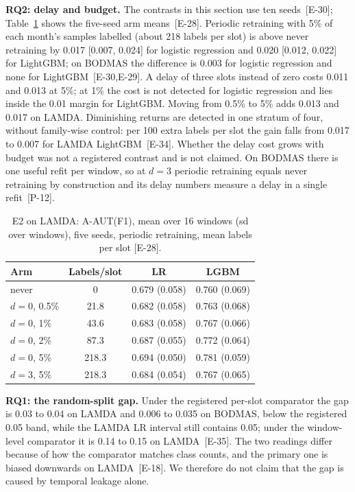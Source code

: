 \documentclass[conference,a4paper]{IEEEtran}
\newcommand{\clm}[1]{{\scriptsize[#1]}}
\begin{document}
\textbf{RQ2: delay and budget.} The contrasts in this section use ten seeds~\clm{E-30}; Table~\ref{tab:e2} shows the five-seed arm means~\clm{E-28}. Periodic retraining with 5\% of each month's samples labelled (about 218 labels per slot) is above never retraining by 0.017 [0.007, 0.024] for logistic regression and 0.020 [0.012, 0.022] for LightGBM; on BODMAS the difference is 0.003 for logistic regression and none for LightGBM~\clm{E-30,E-29}. A delay of three slots instead of zero costs 0.011 and 0.013 at 5\%; at 1\% the cost is not detected for logistic regression and lies inside the 0.01 margin for LightGBM. Moving from 0.5\% to 5\% adds 0.013 and 0.017 on LAMDA. Diminishing returns are detected in one stratum of four, without family-wise control: per 100 extra labels per slot the gain falls from 0.017 to 0.007 for LAMDA LightGBM~\clm{E-34}. Whether the delay cost grows with budget was not a registered contrast and is not claimed. On BODMAS there is one useful refit per window, so at $d=3$ periodic retraining equals never retraining by construction and its delay numbers measure a delay in a single refit~\clm{P-12}.

\begin{table}[t]
\centering
\caption{E2 on LAMDA: A-AUT(F1), mean over 16 windows (sd over windows), five seeds, periodic retraining, mean labels per slot \clm{E-28}.}
\label{tab:e2}
\small
\begin{tabular}{@{}lccc@{}}
\toprule
Arm & Labels/slot & LR & LGBM\\
\midrule
never & 0 & 0.679 (0.058) & 0.760 (0.069)\\
$d{=}0$, 0.5\% & 21.8 & 0.682 (0.058) & 0.763 (0.068)\\
$d{=}0$, 1\% & 43.6 & 0.683 (0.058) & 0.767 (0.066)\\
$d{=}0$, 2\% & 87.3 & 0.687 (0.055) & 0.772 (0.064)\\
$d{=}0$, 5\% & 218.3 & 0.694 (0.050) & 0.781 (0.059)\\
$d{=}3$, 5\% & 218.3 & 0.684 (0.054) & 0.767 (0.065)\\
\bottomrule
\end{tabular}
\end{table}

\textbf{RQ1: the random-split gap.} Under the registered per-slot comparator the gap is 0.03 to 0.04 on LAMDA and 0.006 to 0.035 on BODMAS, below the registered 0.05 band, while the LAMDA LR interval still contains 0.05; under the window-level comparator it is 0.14 to 0.15 on LAMDA~\clm{E-35}. The two readings differ because of how the comparator matches class counts, and the primary one is biased downwards on LAMDA~\clm{E-18}. We therefore do not claim that the gap is caused by temporal leakage alone.
\end{document}
